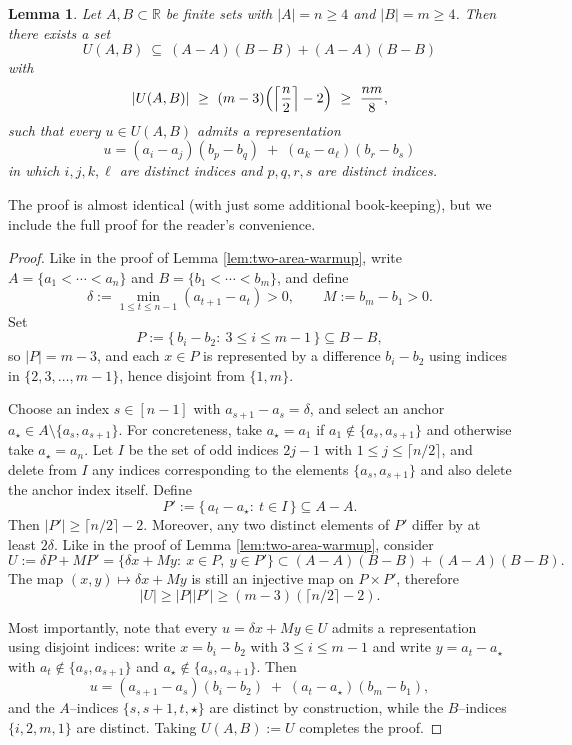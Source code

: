 \documentclass[12pt]{amsart}
\newtheorem{lemma}[theorem]{Lemma}
\theoremstyle{definition}
\theoremstyle{remark}
\newcommand{\RR}{\mathbb{R}}
\begin{document}
\begin{lemma}\label{lem:two-area-pool}
Let $A,B\subset\RR$ be finite sets with $|A|=n\ge 4$ and $|B|=m\ge 4$. Then there exists a set
\[
U(A,B)\ \subseteq\ (A-A)(B-B)+(A-A)(B-B)
\]
with
\[
|U(A,B)|\ \ge\ (m-3)\Bigl(\Bigl\lceil\frac n2\Bigr\rceil-2\Bigr)\ \ge\ \frac{nm}{8},
\]
such that every $u\in U(A,B)$ admits a representation
\[
u=(a_i-a_j)(b_p-b_q)\;+\;(a_k-a_\ell)(b_r-b_s)
\]
in which $i,j,k,\ell$ are \emph{distinct} indices and $p,q,r,s$ are \emph{distinct} indices.
\end{lemma}

The proof is almost identical (with just some additional book-keeping), but we include the full proof for the reader's convenience. 

\begin{proof}
Like in the proof of Lemma \ref{lem:two-area-warmup}, write $A=\{a_1<\cdots<a_n\}$ and $B=\{b_1<\cdots<b_m\}$, and define 
\[
\delta:=\min_{1\le t\le n-1}(a_{t+1}-a_t)>0,
\qquad
M:=b_m-b_1>0.
\]
Set
\[
P:=\{\,b_i-b_2:\ 3\le i\le m-1\,\}\subseteq B-B,
\]
so $|P|=m-3$, and each $x\in P$ is represented by a difference $b_i-b_2$ using indices in
$\{2,3,\dots,m-1\}$, hence disjoint from $\{1,m\}$.

Choose an index $s \in [n-1]$ with $a_{s+1}-a_s=\delta$, and select an anchor $a_\star\in A\setminus\{a_s,a_{s+1}\}$. For concreteness, take $a_\star=a_1$ if
$a_1\notin\{a_s,a_{s+1}\}$ and otherwise take $a_\star=a_n$.  Let $I$ be the set of odd indices
$2j-1$ with $1\le j\le\lceil n/2\rceil$, and delete from $I$ any indices corresponding to the elements $\{a_s,a_{s+1}\}$ and also delete the anchor index itself.
Define
\[
P':=\{\,a_t-a_\star:\ t\in I\,\}\subseteq A-A.
\]
Then $|P'|\ge \lceil n/2\rceil-2$.  Moreover, any two distinct elements of $P'$ differ by at least
$2\delta$. Like in the proof of Lemma \ref{lem:two-area-warmup}, consider
\[
U:=\delta P+MP'=\{\delta x+My:\ x\in P,\ y\in P'\} \subset (A-A)(B-B)+(A-A)(B-B).
\]
The map $(x,y)\mapsto \delta x+My$ is still an injective map on $P\times P'$, therefore 
$$|U| \geq |P||P'|\ge (m-3)(\lceil n/2\rceil-2).$$

Most importantly, note that every $u=\delta x+My\in U$ admits a representation using disjoint indices: write
$x=b_i-b_2$ with $3\le i\le m-1$ and write $y=a_t-a_\star$ with $a_t\notin\{a_s,a_{s+1}\}$ and
$a_\star\notin\{a_s,a_{s+1}\}$.  Then
\[
u=(a_{s+1}-a_s)(b_i-b_2)\;+\;(a_t-a_\star)(b_m-b_1),
\]
and the $A$--indices $\{s,s+1,t,\star\}$ are distinct by construction, while the $B$--indices
$\{i,2,m,1\}$ are distinct.  Taking $U(A,B):=U$ completes the proof.
\end{proof}
\end{document}
